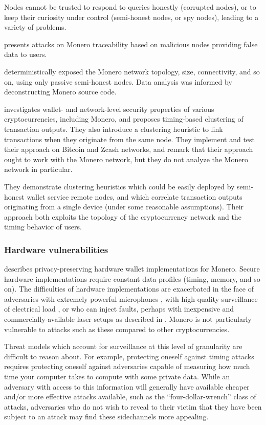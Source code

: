 \documentclass{article}
\theoremstyle{definition}
\begin{document}
Nodes cannot be trusted to respond to queries honestly (corrupted nodes), or to keep their curiosity under control (semi-honest nodes, or spy nodes), leading to a variety of problems.

\cite{lee2018authenticated} presents attacks on Monero traceability based on malicious nodes providing false data to users.

\cite{cao2020exploring} deterministically exposed the Monero network topology, size, connectivity, and so on, using only passive semi-honest nodes.
Data analysis was informed by deconstructing Monero source code.

\cite{biryukov2019security} investigates wallet- and network-level security properties of various cryptocurrencies, including Monero, and proposes timing-based clustering of transaction outputs.
They also introduce a clustering heuristic to link transactions when they originate from the same node.
They implement and test their approach on Bitcoin and Zcash networks, and remark that their approach ought to work with the Monero network, but they do not analyze the Monero network in particular.

They demonstrate clustering heuristics which could be easily deployed by semi-honest wallet service remote nodes, and which correlate transaction outputs originating from a single device (under some reasonable assumptions).
Their approach both exploits the topology of the cryptocurrency network and the timing behavior of users.


\subsubsection{Hardware vulnerabilities}

\cite{klinec2020privacy} describes privacy-preserving hardware wallet implementations for Monero.
Secure hardware implementations require constant data profiles (timing, memory, and so on).
The difficulties of hardware implementations are exacerbated in the face of adversaries with extremely powerful microphones \cite{genkin2014rsa}, with high-quality surveillance of electrical load \cite{yen2005power}, or who can inject faults, perhaps with inexpensive and commercially-available laser setups as described in \cite{mathurflipping}.
Monero is not particularly vulnerable to attacks such as these compared to other cryptocurrencies.

Threat models which account for surveillance at this level of granularity are difficult to reason about.
For example, protecting oneself against timing attacks requires protecting oneself against adversaries capable of measuring how much time your computer takes to compute with some private data.
While an adversary with access to this information will generally have available cheaper and/or more effective attacks available, such as the ``four-dollar-wrench'' class of attacks, adversaries who do not wish to reveal to their victim that they have been subject to an attack may find these sidechannels more appealing.
\end{document}
